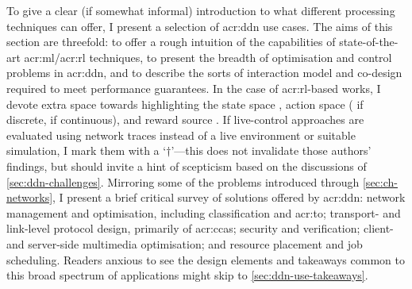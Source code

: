 To give a clear (if somewhat informal) introduction to what different processing techniques can offer, I present a selection of \gls{acr:ddn} use cases.
The aims of this section are threefold: to offer a rough intuition of the capabilities of state-of-the-art \gls{acr:ml}/\gls{acr:rl} techniques, to present the breadth of optimisation and control problems in \gls{acr:ddn}, and to describe the sorts of interaction model and co-design required to meet performance guarantees.
In the case of \gls{acr:rl}-based works, I devote extra space towards highlighting the state space \prllitstate{}, action space (\rllitact{} if discrete, \rllitactreal{} if continuous), and reward source \prllitreward.
If live-control approaches are evaluated using network traces instead of a live environment or suitable simulation, I mark them with a `$\dagger$'---this does not invalidate those authors' findings, but should invite a hint of scepticism based on the discussions of \cref{sec:ddn-challenges}.
Mirroring some of the problems introduced through \cref{sec:ch-networks}, I present a brief critical survey of solutions offered by \gls{acr:ddn}: network management and optimisation, including classification and \gls{acr:to}; transport- and link-level protocol design, primarily of \glspl{acr:cca}; security and verification; client- and server-side multimedia optimisation; and resource placement and job scheduling.
Readers anxious to see the design elements and takeaways common to this broad spectrum of applications might skip to \cref{sec:ddn-use-takeaways}.
%
%
%
%
%
%



